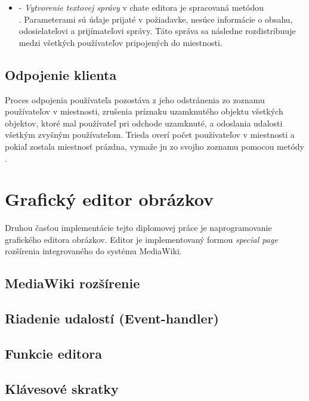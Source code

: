 \begin{itemize}
	\item {} - \textit{Vytvorenie textovej správy} v chate editora je spracovaná metódou \\ . Parameterami sú údaje prijaté v požiadavke, nesúce informácie o obsahu, odosielateľovi a prijímateľovi správy. Táto správa sa následne rozdistribuuje medzi všetkých používateľov pripojených do miestnosti.
	
\end{itemize}

\subsection{Odpojenie klienta}
Proces odpojenia používateľa pozostáva z jeho odstránenia zo zoznamu používateľov v miestnosti, zrušenia príznaku uzamknutého objektu všetkých objektov, ktoré mal používateľ pri odchode uzamknuté, a odoslania udalosti všetkým zvyšným používateľom. Trieda  overí počet používateľov v miestnosti a pokiaľ zostala miestnosť prázdna, vymaže ju zo svojho zoznamu pomocou metódy .





\section{Grafický editor obrázkov}
Druhou časťou implementácie tejto diplomovej práce je naprogramovanie grafického editora obrázkov. Editor je implementovaný formou \textit{special page} rozšírenia integrovaného do systému MediaWiki. 

\subsection{MediaWiki rozšírenie}

\subsection{Riadenie udalostí (Event-handler)}

\subsection{Funkcie editora}

\subsection{Klávesové skratky}

